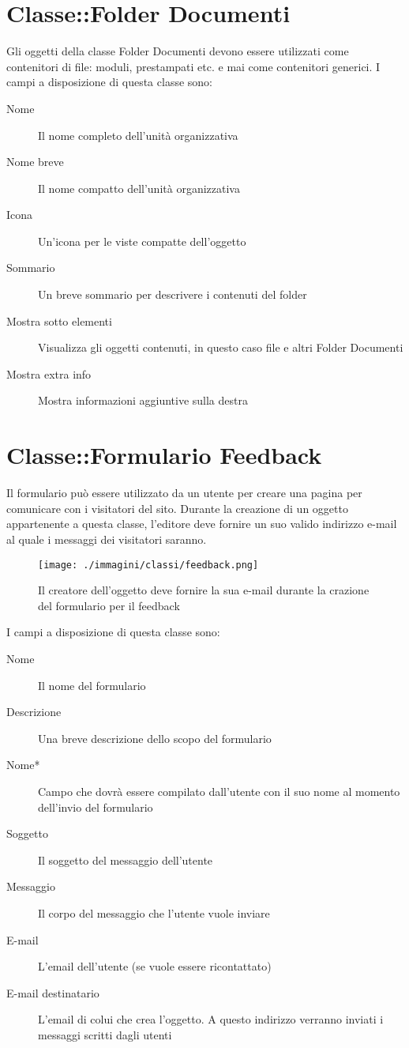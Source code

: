 \section{Classe::Folder Documenti}
Gli oggetti della classe Folder Documenti devono essere utilizzati come contenitori di file: moduli, prestampati etc. e mai come contenitori generici. I campi a disposizione di questa classe sono:
\begin{description}
\item[Nome] Il nome completo dell'unità organizzativa
\item[Nome breve]  Il nome compatto dell'unità organizzativa
\item[Icona]Un'icona per le viste compatte dell'oggetto
\item[Sommario] Un breve sommario per descrivere i contenuti del folder
\item[Mostra sotto elementi] Visualizza gli oggetti contenuti, in questo caso file e altri Folder Documenti
\item[Mostra extra info]Mostra informazioni aggiuntive sulla destra
\end{description}

\section{Classe::Formulario Feedback}
Il formulario può essere utilizzato da un utente per creare una pagina per comunicare con i visitatori del sito. Durante la creazione di un oggetto appartenente a questa classe, l'editore deve fornire un suo valido indirizzo e-mail al quale i messaggi dei visitatori saranno.
\begin{figure}[H]
 \centering
 \texttt{[image: ./immagini/classi/feedback.png]}
 \caption{Il creatore dell'oggetto deve fornire la sua e-mail durante la crazione del formulario per il feedback}
 \label{fig:feedback}
\end{figure}
I campi a disposizione di questa classe sono:
\begin{description}
\item[Nome] Il nome del formulario
\item[Descrizione] Una breve descrizione dello scopo del formulario
\item[Nome*]Campo che dovrà essere compilato dall'utente con il suo nome al momento dell'invio del formulario
\item[Soggetto]Il soggetto del messaggio dell'utente
\item[Messaggio] Il corpo del messaggio che l'utente vuole inviare
\item[E-mail]L'email dell'utente (se vuole essere ricontattato)
\item[E-mail destinatario]L'email di colui che crea l'oggetto. A questo indirizzo verranno inviati i messaggi scritti dagli utenti
\end{description}

